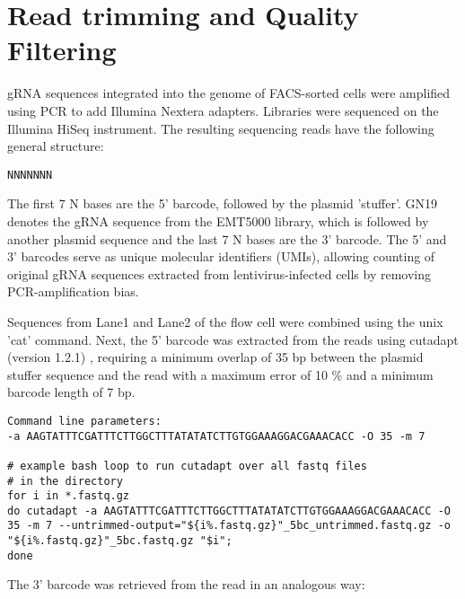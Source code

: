 \section{Read trimming and Quality Filtering}
\label{sec:Bioinformatic analysis of screens with EMT5000 control library and stable cell lines}

   
gRNA sequences integrated into the genome of FACS-sorted cells were amplified using PCR to add Illumina Nextera adapters. Libraries were sequenced on the Illumina HiSeq instrument. The resulting sequencing reads have the following general structure:

\texttt{{\color{my-green}NNNNNNN}}

The first 7 N bases are the {\color{my-green}5' barcode}, followed by the plasmid 'stuffer'.  GN19 denotes the {\color{my-orange}gRNA sequence} from the EMT5000 library, which is followed by another plasmid sequence and the last 7 N bases are the {\color{my-blue}3' barcode}. The 5' and 3' barcodes serve as unique molecular identifiers (UMIs), allowing counting of original gRNA sequences extracted from lentivirus-infected cells by removing PCR-amplification bias.

Sequences from Lane1 and Lane2 of the flow cell were combined using the unix 'cat' command. Next, the 5' barcode was extracted from the reads using cutadapt (version 1.2.1) \cite{Martin:2011va}, requiring a minimum overlap of 35 bp between the plasmid stuffer sequence and the read with a maximum error of 10 \% and a minimum barcode length of 7 bp.

\begin{lstlisting}
Command line parameters:
-a AAGTATTTCGATTTCTTGGCTTTATATATCTTGTGGAAAGGACGAAACACC -O 35 -m 7 

# example bash loop to run cutadapt over all fastq files 
# in the directory
for i in *.fastq.gz
do cutadapt -a AAGTATTTCGATTTCTTGGCTTTATATATCTTGTGGAAAGGACGAAACACC -O 35 -m 7 --untrimmed-output="${i%.fastq.gz}"_5bc_untrimmed.fastq.gz -o "${i%.fastq.gz}"_5bc.fastq.gz "$i";
done
\end{lstlisting}

The 3' barcode was retrieved from the read in an analogous way:

